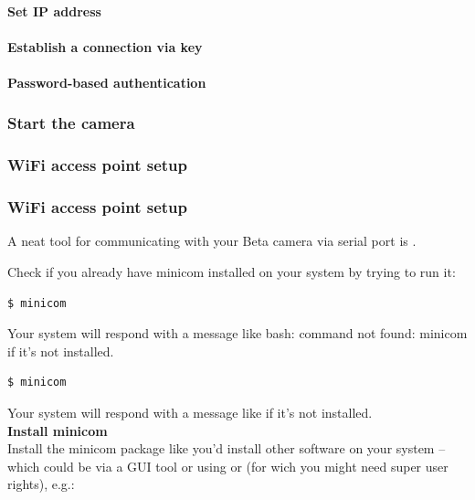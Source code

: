 \paragraph{Set IP address}
\paragraph{Establish a connection via key}
\paragraph{Password-based authentication}
\subsubsection{Start the camera}
\subsubsection{WiFi access point setup}

\subsubsection{WiFi access point setup}


A neat tool for communicating with your Beta camera via serial port is .

Check if you already have minicom installed on your system by trying to run it:

\begin{lstlisting}[language=bash,morekeywords=$,keywordstyle=\bfseries,frame=none,xleftmargin=.25in,belowskip=2em, aboveskip=2em]
$ minicom
\end{lstlisting}
Your system will respond with a message like bash: command not found: minicom if it's not installed.


\begin{lstlisting}[language=bash,morekeywords=$,keywordstyle=\bfseries,frame=none,xleftmargin=.25in,belowskip=2em, aboveskip=2em]
$ minicom
\end{lstlisting}

Your system will respond with a message like  if it's not installed.\\

\textbf{Install minicom}\\

Install the minicom package like you'd install other software on your system – which could be via a GUI tool or using  or  (for wich you might need super user rights), e.g.: 

